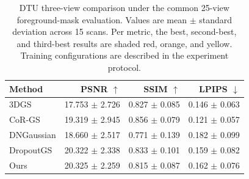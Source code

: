 \begin{table}[t]
\centering
\caption{DTU three-view comparison under the common 25-view foreground-mask evaluation. Values are mean $\pm$ standard deviation across 15 scans. Per metric, the best, second-best, and third-best results are shaded red, orange, and yellow. Training configurations are described in the experiment protocol.}
\label{tab:dtu_main}
\begin{tabular}{lrrr}
\toprule
Method & PSNR $\uparrow$ & SSIM $\uparrow$ & LPIPS $\downarrow$ \\
\midrule
3DGS & 17.753 $\pm$ 2.726 & \cellcolor{rankthird}0.827 $\pm$ 0.085 & \cellcolor{ranksecond}0.146 $\pm$ 0.063 \\
CoR-GS & \cellcolor{rankthird}19.319 $\pm$ 2.945 & \cellcolor{rankbest}0.856 $\pm$ 0.079 & \cellcolor{rankbest}0.121 $\pm$ 0.057 \\
DNGaussian & 18.660 $\pm$ 2.517 & 0.771 $\pm$ 0.139 & 0.182 $\pm$ 0.099 \\
DropoutGS & \cellcolor{ranksecond}20.322 $\pm$ 2.338 & \cellcolor{ranksecond}0.833 $\pm$ 0.101 & \cellcolor{rankthird}0.159 $\pm$ 0.082 \\
Ours & \cellcolor{rankbest}20.325 $\pm$ 2.259 & 0.815 $\pm$ 0.087 & 0.162 $\pm$ 0.076 \\
\bottomrule
\end{tabular}
\end{table}
